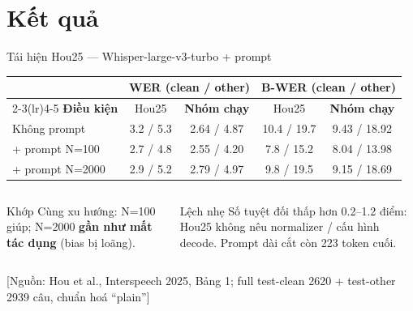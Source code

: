\documentclass[aspectratio=169,xcolor=table]{beamer}
\newcommand{\hi}[1]{\textcolor{Primary}{\textbf{#1}}}
\newcommand{\src}[1]{{\tiny\color{TextGray}[Nguồn: #1]}}
\begin{document}
\section{Kết quả}
\begin{frame}{Tái hiện Hou25 --- Whisper-large-v3-turbo + prompt}
\small\renewcommand{\arraystretch}{1.25}
\begin{center}
\begin{tabular}{@{}lcccc@{}}
\toprule
& \multicolumn{2}{c}{\textbf{WER} (clean / other)} & \multicolumn{2}{c}{\textbf{B-WER} (clean / other)}\\
\cmidrule(lr){2-3}\cmidrule(lr){4-5}
\textbf{Điều kiện} & Hou25 & \hi{Nhóm chạy} & Hou25 & \hi{Nhóm chạy}\\
\midrule
Không prompt & 3.2 / 5.3 & 2.64 / 4.87 & 10.4 / 19.7 & 9.43 / 18.92\\
+ prompt N=100 & 2.7 / 4.8 & 2.55 / 4.20 & 7.8 / 15.2 & 8.04 / 13.98\\
+ prompt N=2000 & 2.9 / 5.2 & 2.79 / 4.97 & 9.8 / 19.5 & 9.15 / 18.69\\
\bottomrule
\end{tabular}
\end{center}
\vspace{0.15cm}
\begin{columns}[T,onlytextwidth]
\begin{block}{Khớp}
\small Cùng xu hướng: N=100 giúp; N=2000 \textbf{gần như mất tác dụng} (bias bị loãng).
\end{block}
\begin{alertblock}{Lệch nhẹ}
\small Số tuyệt đối thấp hơn 0.2--1.2 điểm: Hou25 không nêu normalizer / cấu hình decode. Prompt dài cắt còn 223 token cuối.
\end{alertblock}
\end{columns}
\vfill\src{Hou et al., Interspeech 2025, Bảng 1; full test-clean 2620 + test-other 2939 câu, chuẩn hoá ``plain''}
\end{frame}
\end{document}
